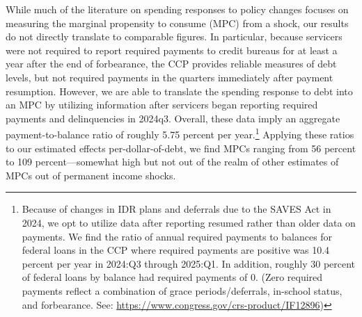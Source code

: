 \documentclass[12pt]{article}
\begin{document}
While much of the literature on spending responses to policy changes focuses on measuring the marginal propensity to consume (MPC) from a shock, our results do not directly translate to comparable figures.  In particular, because servicers were not required to report required payments to credit bureaus for at least a year after the end of forbearance, the CCP provides reliable measures of debt levels, but not required payments in the quarters immediately after payment resumption.  However, we are able to translate the spending response to debt into an MPC by utilizing information after servicers began reporting required payments and delinquencies in 2024q3. Overall, these data imply an aggregate payment-to-balance ratio of roughly 5.75 percent per year.\footnote{Because of changes in IDR plans and deferrals due to the SAVES Act in 2024, we opt to utilize data after reporting resumed rather than older data on payments. We find the ratio of annual required payments to balances for federal loans in the CCP where required payments are positive was 10.4 percent per year in 2024:Q3 through 2025:Q1.  In addition, roughly 30 percent of federal loans by balance had required payments of 0. (Zero required payments reflect a combination of grace periods/deferrals, in-school status, and forbearance. See: \url{https://www.congress.gov/crs-product/IF12896})} Applying these ratios to our estimated effects per-dollar-of-debt, we find MPCs ranging from 56 percent to 109 percent---somewhat high but not out of the realm of other estimates of MPCs out of permanent income shocks.

\end{document}
